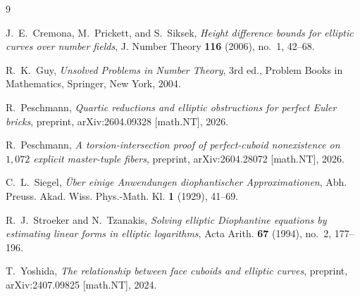 \documentclass[11pt,reqno]{amsart}
\theoremstyle{plain}
\theoremstyle{definition}
\begin{document}
\begin{thebibliography}{9}

 J.~E.~Cremona, M.~Prickett, and S.~Siksek, \emph{Height difference bounds
for elliptic curves over number fields}, J. Number Theory \textbf{116} (2006), no.~1,
42--68.

 R.~K.~Guy, \emph{Unsolved Problems in Number Theory}, 3rd ed.,
Problem Books in Mathematics, Springer, New York, 2004.

 R.~Peschmann, \emph{Quartic reductions and elliptic obstructions for
perfect Euler bricks}, preprint, arXiv:2604.09328 [math.NT], 2026.

 R.~Peschmann, \emph{A torsion-intersection proof of perfect-cuboid
nonexistence on $1{,}072$ explicit master-tuple fibers}, preprint,
arXiv:2604.28072 [math.NT], 2026.

 C.~L.~Siegel, \emph{\"Uber einige Anwendungen diophantischer
Approximationen}, Abh. Preuss. Akad. Wiss. Phys.-Math. Kl. \textbf{1} (1929), 41--69.

 R.~J.~Stroeker and N.~Tzanakis, \emph{Solving elliptic
Diophantine equations by estimating linear forms in elliptic logarithms}, Acta Arith.
\textbf{67} (1994), no.~2, 177--196.

 T.~Yoshida, \emph{The relationship between face cuboids and elliptic
curves}, preprint, arXiv:2407.09825 [math.NT], 2024.

\end{thebibliography}
\end{document}
